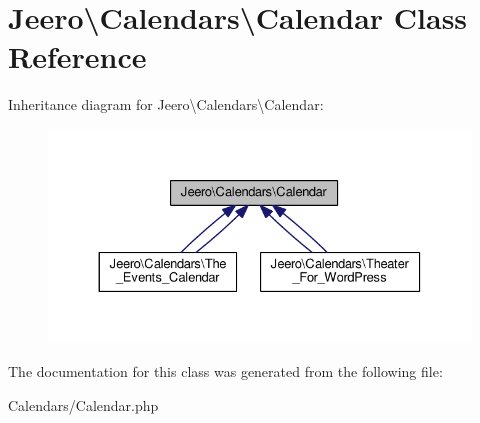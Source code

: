 \hypertarget{classJeero_1_1Calendars_1_1Calendar}{}\section{Jeero\textbackslash{}Calendars\textbackslash{}Calendar Class Reference}
\label{classJeero_1_1Calendars_1_1Calendar}


Inheritance diagram for Jeero\textbackslash{}Calendars\textbackslash{}Calendar\+:\nopagebreak
\begin{figure}[H]
\begin{center}
\leavevmode
\includegraphics[width=330pt]{classJeero_1_1Calendars_1_1Calendar__inherit__graph}
\end{center}
\end{figure}


The documentation for this class was generated from the following file\+:\begin{DoxyCompactItemize}
\item 
Calendars/Calendar.\+php\end{DoxyCompactItemize}
